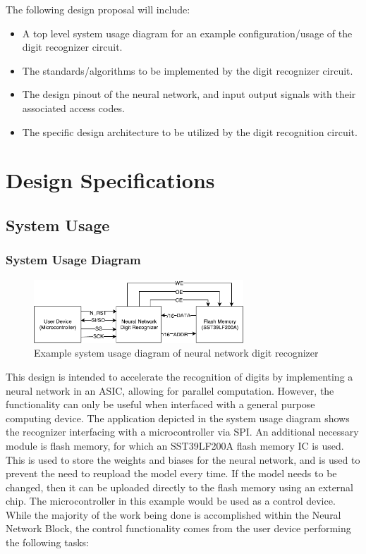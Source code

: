 \documentclass[12pt]{article}
\begin{document}
The following design proposal will include:

\begin{itemize}
    \item A top level system usage diagram for an example configuration/usage of the digit recognizer circuit.
    \item The standards/algorithms to be implemented by the digit recognizer circuit.
    \item The design pinout of the neural network, and input output signals with their associated access codes.
    \item The specific design architecture to be utilized by the digit recognition circuit.
\end{itemize}

\section{Design Specifications}
\subsection{System Usage}
\subsubsection{System Usage Diagram\label{sec:sysuse}}
\begin{figure}[H]
    \centering
    \includegraphics[width=0.7\textwidth]{top_level_block.pdf}
    \caption{Example system usage diagram of neural network digit recognizer}
    \label{fig:top}
\end{figure}

This design is intended to accelerate the recognition of digits by implementing a neural network in an ASIC, allowing for parallel computation. However, the functionality can only be useful when interfaced with a general purpose computing device. The application depicted in the system usage diagram shows the recognizer interfacing with a microcontroller via SPI. An additional necessary module is flash memory, for which an SST39LF200A flash memory IC\cite{flash} is used. This is used to store the weights and biases for the neural network, and is used to prevent the need to reupload the model every time. If the model needs to be changed, then it can be uploaded directly to the flash memory using an external chip. The microcontroller in this example would be used as a control device. While the majority of the work being done is accomplished within the Neural Network Block, the control functionality comes from the user device performing the following tasks:
\end{document}
